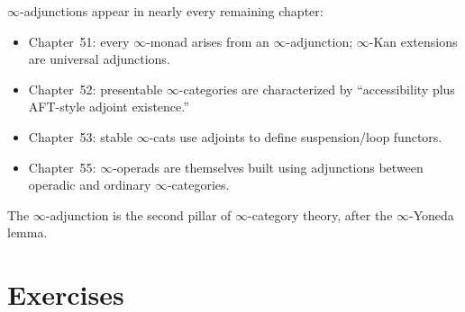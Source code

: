 \begin{remark}
$\infty$-adjunctions appear in nearly every remaining chapter:
\begin{itemize}
  \item Chapter~51: every $\infty$-monad arises from an $\infty$-adjunction;
        $\infty$-Kan extensions are universal adjunctions.
  \item Chapter~52: presentable $\infty$-categories are characterized by
        ``accessibility plus AFT-style adjoint existence.''
  \item Chapter~53: stable $\infty$-cats use adjoints to define
        suspension/loop functors.
  \item Chapter~55: $\infty$-operads are themselves built using
        adjunctions between operadic and ordinary $\infty$-categories.
\end{itemize}
The $\infty$-adjunction is the second pillar of $\infty$-category
theory, after the $\infty$-Yoneda lemma.
\end{remark}


\section{Exercises}
\label{sec:adjunctions-exercises}

